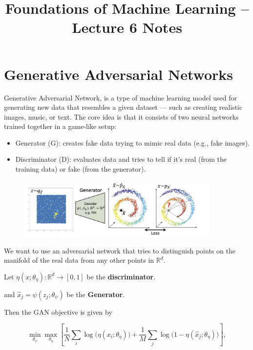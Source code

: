 \documentclass[11pt]{article}
\title{Foundations of Machine Learning -- Lecture 6 Notes}
\author{}
\date{}
\begin{document}
\maketitle

\section*{Generative Adversarial Networks}

Generative Adversarial Network, is a type of machine learning model used for generating new data that resembles a given dataset — such as creating realistic images, music, or text.
The core idea is that it consists of two neural networks trained together in a game-like setup:
\begin{itemize}
	\item Generator (G): creates fake data trying to mimic real data (e.g., fake images).
	\item Discriminator (D): evaluates data and tries to tell if it’s real (from the training data) or fake (from the generator).
\end{itemize}

\begin{figure}[h]
	\centering
	\includegraphics[width=0.9\textwidth]{../imgs/gan_img.png} %
\end{figure}

We want to use an adversarial network that tries to distinguish points on the manifold of the real data
from any other points in $\mathbb{R}^d$.

\medskip

Let $\eta(x; \theta_\eta): \mathbb{R}^d \rightarrow [0, 1]$ be the \textbf{discriminator}.

and $\hat{x}_j = \psi(z_j; \theta_\psi)$ be the \textbf{Generator}.

\medskip

Then the GAN objective is given by

\[
	\min_{\theta_\psi} \max_{\theta_\eta}
	\left[
		\frac{1}{N} \sum_i \log \big( \eta(x_i; \theta_\eta) \big)
		+
		\frac{1}{M} \sum_j \log \big( 1 - \eta(\hat{x}_j; \theta_\eta) \big)
		\right],
\]
\end{document}
